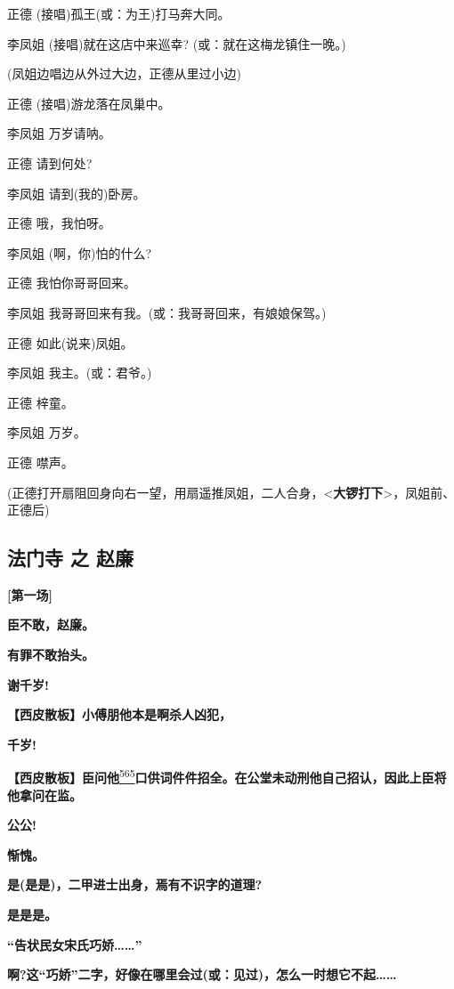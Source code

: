 正德 (接唱)孤王(或：为王)打马奔大同。

李凤姐 (接唱)就在这店中来巡幸? (或：就在这梅龙镇住一晚。)

(凤姐边唱边从外过大边，正德从里过小边)

正德 (接唱)游龙落在凤巢中。

李凤姐 万岁请呐。

正德 请到何处?

李凤姐 请到(我的)卧房。

正德 哦，我怕呀。

李凤姐 (啊，你)怕的什么?

正德 我怕你哥哥回来。

李凤姐 我哥哥回来有我。(或：我哥哥回来，有娘娘保驾。)

正德 如此(说来)凤姐。

李凤姐 我主。(或：君爷。)

正德 梓童。

李凤姐 万岁。

正德 噤声。

(正德打开扇阻回身向右一望，用扇遥推凤姐，二人合身，\textless{}\textbf{大锣打下}\textgreater{}，凤姐前、正德后)

\newpage
\hypertarget{ux6cd5ux95e8ux5bfa-ux4e4b-ux8d75ux5ec9}{%
\subsection{法门寺 之
赵廉}\label{ux6cd5ux95e8ux5bfa-ux4e4b-ux8d75ux5ec9}}

\textbf{{[}第一场{]}}

\textbf{臣不敢，赵廉。}

\textbf{有罪不敢抬头。}

\textbf{谢千岁!}

\textbf{【西皮散板】小傅朋他本是啊杀人凶犯，}

\textbf{千岁!}

\textbf{【西皮散板】臣问他}\protect\hyperlink{fn565}{\textsuperscript{565}}\textbf{口供词件件招全。在公堂未动刑他自己招认，因此上臣将他拿问在监。}

\textbf{公公!}

\textbf{惭愧。}

\textbf{是(是是)，二甲进士出身，焉有不识字的道理?}

\textbf{是是是。}

\textbf{``告状民女宋氏巧娇\ldots{}\ldots{}''}

\textbf{啊?这``巧娇''二字，好像在哪里会过(或：见过)，怎么一时想它不起\ldots{}\ldots{}}

